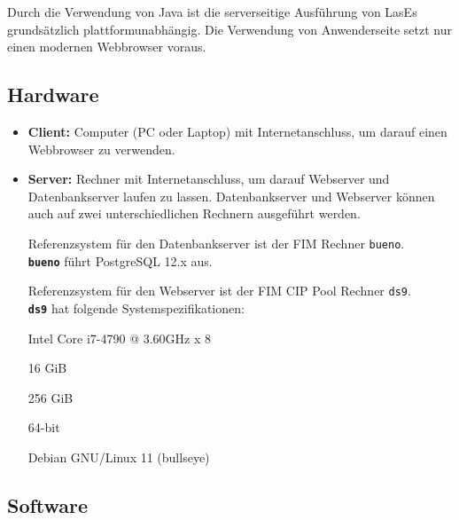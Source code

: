 
Durch die Verwendung von Java ist die serverseitige Ausführung von LasEs
grundsätzlich plattformunabhängig.
Die Verwendung von Anwenderseite setzt nur einen modernen Webbrowser voraus.

\subsection{Hardware}

\begin{itemize}
	\item \textbf{Client:} Computer (PC oder Laptop) mit Internetanschluss, um darauf einen Webbrowser zu verwenden.

	\item \textbf{Server:} Rechner mit Internetanschluss, um darauf Webserver und Datenbankserver laufen zu lassen. Datenbankserver und Webserver können auch auf zwei unterschiedlichen Rechnern ausgeführt werden.

	\label{dbspezi}
	Referenzsystem für den Datenbankserver ist der FIM Rechner \texttt{bueno}.\\
	\texttt{\textbf{bueno}} führt PostgreSQL 12.x aus.

	\label{spezi}

	Referenzsystem für den Webserver ist der FIM CIP Pool Rechner \texttt{ds9}.\\
	\texttt{\textbf{ds9}} hat folgende Systemspezifikationen:

	\begin{itemize}
		 Intel Core i7-4790 @ 3.60GHz x 8

		 16 GiB

		 256 GiB

		 64-bit

		 Debian GNU/Linux 11 (bullseye)
	\end{itemize}


\end{itemize}

\subsection{Software}

